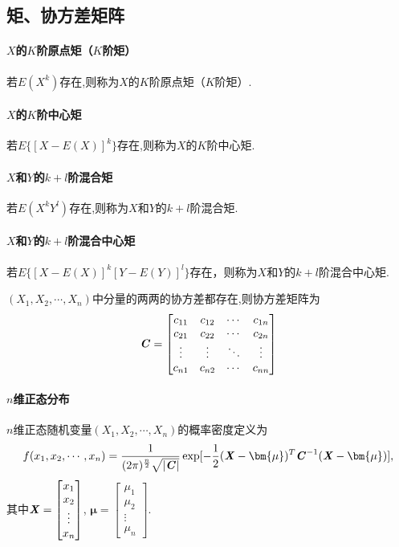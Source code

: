 \documentclass[UTF8]{ctexart}
\begin{document}
\subsection{矩、协方差矩阵}

\paragraph{$X$的$K$阶原点矩（$K$阶矩）}若$E(X^k)$存在,则称为$X$的$K$阶原点矩（$K$阶矩）.
\paragraph{$X$的$K$阶中心矩}若$E\{[X-E(X)]^k\}$存在,则称为$X$的$K$阶中心矩.
\paragraph{$X$和$Y$的$k+l$阶混合矩}若$E(X^kY^l)$存在,则称为$X$和$Y$的$k+l$阶混合矩.
\paragraph{$X$和$Y$的$k+l$阶混合中心矩}若$E\{[X-E(X)]^k[Y-E(Y)]^l\}$存在，则称为$X$和$Y$的$k+l$阶混合中心矩.

\begin{tcolorbox}[colframe=white!60!black,title={\subsubsection{协方差矩阵}}]
    $(X_1,X_2,\cdots,X_n)$中分量的两两的协方差都存在,则协方差矩阵为
    $$\textbf{\emph{C}}=\begin{bmatrix}
        c_{11}&c_{12}&\cdots&c_{1n}\\
        c_{21}&c_{22}&\cdots&c_{2n}\\
        \vdots&\vdots&\ddots&\vdots\\
        c_{n1}&c_{n2}&\cdots&c_{nn}\\
    \end{bmatrix}$$
    \tcblower
    \paragraph{$n$维正态分布}$n$维正态随机变量$(X_1,X_2,\cdots,X_n)$的概率密度定义为
    $$f(x_1,x_2,\cdots,x_n)=\frac{1}{(2\pi)^{\frac{n}{2}}\sqrt{|\textbf{\emph{C}}|}}\exp[-\frac{1}{2}(\textbf{\emph{X}}-\bm{\mu})^T\textbf{\emph{C}}^{-1}(\textbf{\emph{X}}-\bm{\mu})],$$
    \qquad 其中$\textbf{\emph{X}}=\begin{bmatrix}x_1\\x_2\\\vdots\\x_n\end{bmatrix}$,
    $\bm{\mu}=\begin{bmatrix}\mu_1\\\mu_2\\\vdots\\\mu_n\end{bmatrix}$.
\end{tcolorbox}
\end{document}
